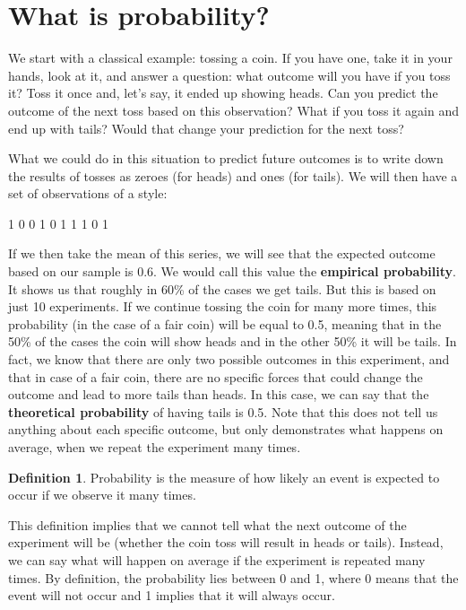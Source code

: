 \documentclass[
]{book}
\theoremstyle{definition}
\newtheorem{definition}{Definition}[chapter]
\theoremstyle{definition}
\theoremstyle{definition}
\theoremstyle{definition}
\theoremstyle{remark}
\begin{document}
\hypertarget{whatIsProbability}{%
\section{What is probability?}\label{whatIsProbability}}

We start with a classical example: tossing a coin. If you have one, take it in your hands, look at it, and answer a question: what outcome will you have if you toss it? Toss it once and, let's say, it ended up showing heads. Can you predict the outcome of the next toss based on this observation? What if you toss it again and end up with tails? Would that change your prediction for the next toss?

What we could do in this situation to predict future outcomes is to write down the results of tosses as zeroes (for heads) and ones (for tails). We will then have a set of observations of a style:

1 0 0 1 0 1 1 1 0 1

If we then take the mean of this series, we will see that the expected outcome based on our sample is 0.6. We would call this value the \textbf{empirical probability}. It shows us that roughly in 60\% of the cases we get tails. But this is based on just 10 experiments. If we continue tossing the coin for many more times, this probability (in the case of a fair coin) will be equal to 0.5, meaning that in the 50\% of the cases the coin will show heads and in the other 50\% it will be tails. In fact, we know that there are only two possible outcomes in this experiment, and that in case of a fair coin, there are no specific forces that could change the outcome and lead to more tails than heads. In this case, we can say that the \textbf{theoretical probability} of having tails is 0.5. Note that this does not tell us anything about each specific outcome, but only demonstrates what happens on average, when we repeat the experiment many times.

\begin{definition}
Probability is the measure of how likely an event is expected to occur if we observe it many times.
\end{definition}

This definition implies that we cannot tell what the next outcome of the experiment will be (whether the coin toss will result in heads or tails). Instead, we can say what will happen on average if the experiment is repeated many times. By definition, the probability lies between 0 and 1, where 0 means that the event will not occur and 1 implies that it will always occur.
\end{document}

